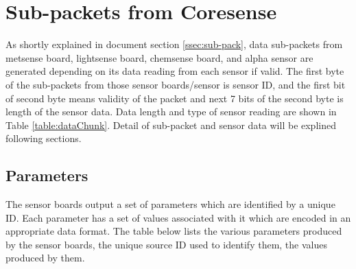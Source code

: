 \newpage
\section{Sub-packets from Coresense}

As shortly explained in document section \ref{ssec:sub-pack}, data sub-packets from metsense board, lightsense board, chemsense board, and alpha sensor are generated depending on its data reading from each sensor if valid. The first byte of the sub-packets from those sensor boards/sensor is sensor ID, and the first bit of second byte means validity of the packet and next 7 bits of the second byte is length of the sensor data. Data length and type of sensor reading are shown in Table \ref{table:dataChunk}. Detail of sub-packet and sensor data will be explined following sections.


\subsection{Parameters}

The sensor boards output a set of parameters which are identified by a unique ID. Each parameter
has a set of values associated with it which are encoded in an appropriate data format. The table
below lists the various parameters produced by the sensor boards, the unique source ID used to identify them, the values produced by them.


